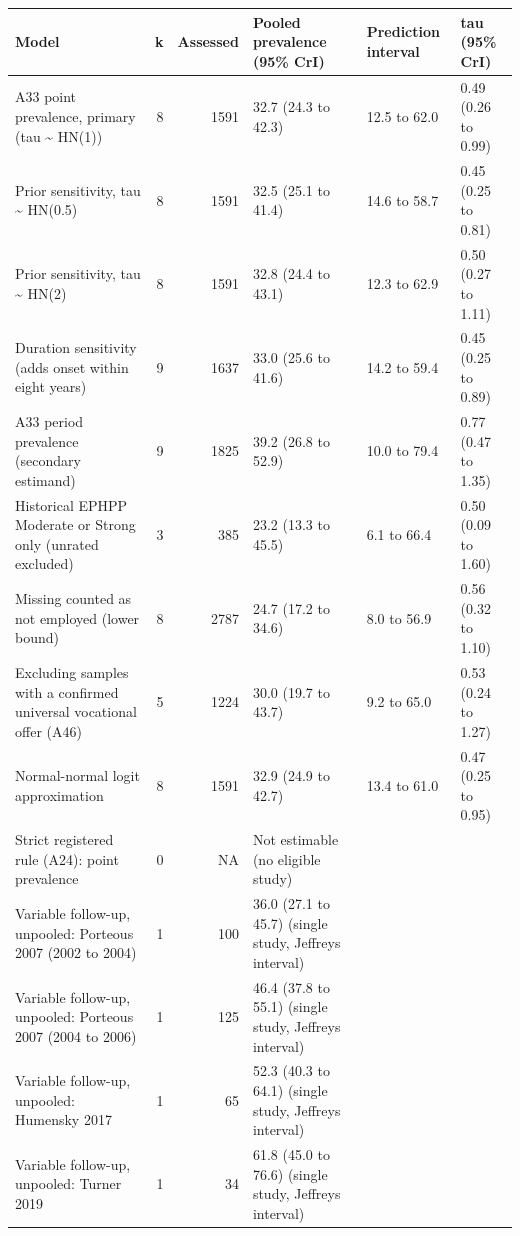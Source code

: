 
\begin{tabular}{p{5.2cm}rrp{3.4cm}p{2.2cm}p{2.4cm}}
\toprule
Model & k & Assessed & Pooled prevalence (95\% CrI) & Prediction interval & tau (95\% CrI)\\
\midrule
A33 point prevalence, primary (tau \textasciitilde{} HN(1)) & 8 & 1591 & 32.7 (24.3 to 42.3) & 12.5 to 62.0 & 0.49 (0.26 to 0.99)\\
Prior sensitivity, tau \textasciitilde{} HN(0.5) & 8 & 1591 & 32.5 (25.1 to 41.4) & 14.6 to 58.7 & 0.45 (0.25 to 0.81)\\
Prior sensitivity, tau \textasciitilde{} HN(2) & 8 & 1591 & 32.8 (24.4 to 43.1) & 12.3 to 62.9 & 0.50 (0.27 to 1.11)\\
Duration sensitivity (adds onset within eight years) & 9 & 1637 & 33.0 (25.6 to 41.6) & 14.2 to 59.4 & 0.45 (0.25 to 0.89)\\
A33 period prevalence (secondary estimand) & 9 & 1825 & 39.2 (26.8 to 52.9) & 10.0 to 79.4 & 0.77 (0.47 to 1.35)\\
Historical EPHPP Moderate or Strong only (unrated excluded) & 3 & 385 & 23.2 (13.3 to 45.5) & 6.1 to 66.4 & 0.50 (0.09 to 1.60)\\
Missing counted as not employed (lower bound) & 8 & 2787 & 24.7 (17.2 to 34.6) & 8.0 to 56.9 & 0.56 (0.32 to 1.10)\\
Excluding samples with a confirmed universal vocational offer (A46) & 5 & 1224 & 30.0 (19.7 to 43.7) & 9.2 to 65.0 & 0.53 (0.24 to 1.27)\\
Normal-normal logit approximation & 8 & 1591 & 32.9 (24.9 to 42.7) & 13.4 to 61.0 & 0.47 (0.25 to 0.95)\\
Strict registered rule (A24): point prevalence & 0 & NA & Not estimable (no eligible study) &  & \\
Variable follow-up, unpooled: Porteous 2007 (2002 to 2004) & 1 & 100 & 36.0 (27.1 to 45.7) (single study, Jeffreys interval) &  & \\
Variable follow-up, unpooled: Porteous 2007 (2004 to 2006) & 1 & 125 & 46.4 (37.8 to 55.1) (single study, Jeffreys interval) &  & \\
Variable follow-up, unpooled: Humensky 2017 & 1 & 65 & 52.3 (40.3 to 64.1) (single study, Jeffreys interval) &  & \\
Variable follow-up, unpooled: Turner 2019 & 1 & 34 & 61.8 (45.0 to 76.6) (single study, Jeffreys interval) &  & \\
\bottomrule
\end{tabular}
